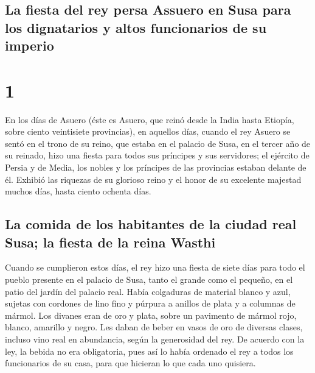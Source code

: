 \hypertarget{la-fiesta-del-rey-persa-assuero-en-susa-para-los-dignatarios-y-altos-funcionarios-de-su-imperio}{%
\subsection{La fiesta del rey persa Assuero en Susa para los dignatarios
y altos funcionarios de su
imperio}\label{la-fiesta-del-rey-persa-assuero-en-susa-para-los-dignatarios-y-altos-funcionarios-de-su-imperio}}

\hypertarget{section}{%
\section{1}\label{section}}

 En los días de Asuero (éste es Asuero, que reinó desde la
India hasta Etiopía, sobre ciento veintisiete provincias),
 en aquellos días, cuando el rey Asuero se sentó en el
trono de su reino, que estaba en el palacio de Susa,  en
el tercer año de su reinado, hizo una fiesta para todos sus príncipes y
sus servidores; el ejército de Persia y de Media, los nobles y los
príncipes de las provincias estaban delante de él. 
Exhibió las riquezas de su glorioso reino y el honor de su excelente
majestad muchos días, hasta ciento ochenta días.

\hypertarget{la-comida-de-los-habitantes-de-la-ciudad-real-susa-la-fiesta-de-la-reina-wasthi}{%
\subsection{La comida de los habitantes de la ciudad real Susa; la
fiesta de la reina
Wasthi}\label{la-comida-de-los-habitantes-de-la-ciudad-real-susa-la-fiesta-de-la-reina-wasthi}}

 Cuando se cumplieron estos días, el rey hizo una fiesta
de siete días para todo el pueblo presente en el palacio de Susa, tanto
el grande como el pequeño, en el patio del jardín del palacio real.
 Había colgaduras de material blanco y azul, sujetas con
cordones de lino fino y púrpura a anillos de plata y a columnas de
mármol. Los divanes eran de oro y plata, sobre un pavimento de mármol
rojo, blanco, amarillo y negro.  Les daban de beber en
vasos de oro de diversas clases, incluso vino real en abundancia, según
la generosidad del rey.  De acuerdo con la ley, la bebida
no era obligatoria, pues así lo había ordenado el rey a todos los
funcionarios de su casa, para que hicieran lo que cada uno quisiera.

